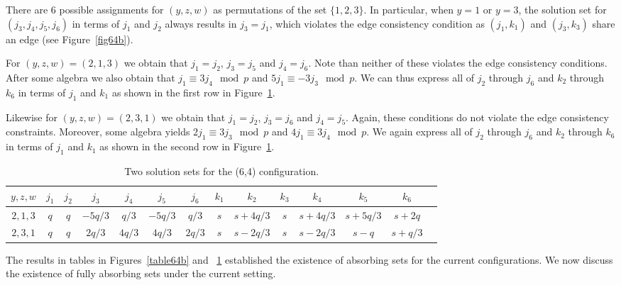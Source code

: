 {There are 6 possible assignments for $(y,z,w)$ as permutations of
the set $\{1,2,3\}$. In particular, when $y=1$ or $y=3$, the
solution set for $(j_3,j_4,j_5,j_6)$ in terms of $j_1$ and $j_2$
always results in $j_3=j_1$, which violates the edge consistency
condition as $(j_1,k_1)$ and $(j_3,k_3)$ share an edge (see
Figure~\ref{fig64b}).

For $(y,z,w)=(2,1,3)$ we obtain that $j_1=j_2$, $j_3=j_5$ and
$j_4=j_6$. Note than neither of these violates the edge
consistency conditions. After some algebra we also obtain that
$j_1 \equiv 3j_4 \mod p$ and $5j_1 \equiv -3j_3 \mod p$. We can
thus express all of $j_2$ through $j_6$ and  $k_2$ through $k_6$
in terms of $j_1$ and $k_1$ as shown in the first row in
Figure~\ref{table64c}.

Likewise for $(y,z,w)=(2,3,1)$ we obtain that $j_1=j_2$, $j_3=j_6$
and $j_4=j_5$. Again, these conditions do not violate the edge
consistency constraints. Moreover, some algebra yields $2j_1
\equiv 3j_3 \mod p$ and $4j_1 \equiv 3j_4 \mod p$. We again
express all of $j_2$ through $j_6$ and  $k_2$ through $k_6$ in
terms of $j_1$ and $k_1$ as shown in the second row in
Figure~\ref{table64c}.


\hspace{-0.2in}\small{\hspace{-0.2in}\begin{table}[ht]\vspace{-0.05in}\hspace{-0.2in}
\begin{tabular}{|c |c|c|c|c|c|c|c|c|c|c|c|c|c|}
  \hline
  $y,z,w$ & $j_1$ & $j_2$ & $j_3$ & $j_4$ & $j_5$ & $j_6$ & $k_1$ & $k_2$ & $k_3$ & $k_4$ & $k_5$ & $k_6$ \\
  \hline
$2,1,3$&  $q$ & $q$ &  $-5q/3$ &  $q/3$ &  $-5q/3$ & $q/3$ & $s$ &
$s+4q/3$ & $s$ & $s+4q/3$ & $s+5q/3$ &
  $s+2q$\\
  \hline
$2,3,1$&  $q$ & $q$ &  $2q/3$ &  $4q/3$ &  $4q/3$ & $2q/3$ & $s$ &
$s-2q/3$ & $s$ & $s-2q/3$ & $s-q$ &
  $s+q/3$\\
  \hline
\end{tabular}
\caption{ Two solution sets for the (6,4)
configuration.}\label{table64c}
\end{table}}
\normalsize
The results in tables in Figures~\ref{table64b} and
~\ref{table64c} established the existence of absorbing sets for
the current configurations. We now discuss the existence of fully
absorbing sets under the current setting.

}
